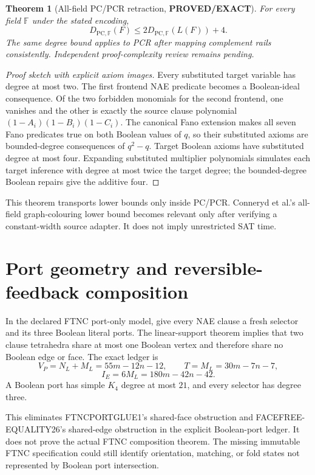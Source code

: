 \documentclass[11pt]{article}
\newtheorem{theorem}{Theorem}
\newcommand{\EXACT}{\textbf{PROVED/EXACT}}
\begin{document}
\begin{theorem}[All-field PC/PCR retraction, \EXACT]
For every field $\mathbb F$ under the stated encoding,
\[
D_{\mathrm{PC},\mathbb F}(F)
\leq2D_{\mathrm{PC},\mathbb F}(L(F))+4.
\]
The same degree bound applies to PCR after mapping complement rails
consistently.  Independent proof-complexity review remains pending.
\end{theorem}
\begin{proof}[Proof sketch with explicit axiom images]
Every substituted target variable has degree at most two.  The first frontend
NAE predicate becomes a Boolean-ideal consequence.  Of the two forbidden
monomials for the second frontend, one vanishes and the other is exactly the
source clause polynomial
$(1-A_i)(1-B_i)(1-C_i)$.  The canonical Fano extension makes all seven Fano
predicates true on both Boolean values of $q$, so their substituted axioms are
bounded-degree consequences of $q^2-q$.  Target Boolean axioms have substituted
degree at most four.  Expanding substituted multiplier polynomials simulates
each target inference with degree at most twice the target degree; the
bounded-degree Boolean repairs give the additive four.
\end{proof}

This theorem transports lower bounds only inside PC/PCR.  Conneryd et al.'s
all-field graph-colouring lower bound becomes relevant only after verifying a
constant-width source adapter.  It does not imply unrestricted SAT time.

\section{Port geometry and reversible-feedback composition}
In the declared FTNC port-only model, give every NAE clause a fresh selector
and its three Boolean literal ports.  The linear-support theorem implies that
two clause tetrahedra share at most one Boolean vertex and therefore share no
Boolean edge or face.  The exact ledger is
\[
\boxed{V_P=N_L+M_L=55m-12n-12},\qquad
\boxed{T=M_L=30m-7n-7},
\]
\[
\boxed{I_E=6M_L=180m-42n-42}.
\]
A Boolean port has simple $K_4$ degree at most $21$, and every selector has
degree three.

This eliminates FTNCPORTGLUE1's shared-face obstruction and
FACEFREE-EQUALITY26's shared-edge obstruction in the explicit Boolean-port
ledger.  It does not prove the actual FTNC composition theorem.  The missing
immutable FTNC specification could still identify orientation, matching, or
fold states not represented by Boolean port intersection.
\end{document}

